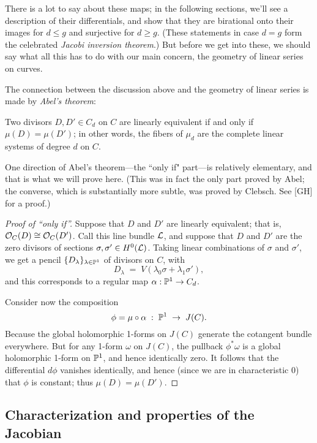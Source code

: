 There is a lot to say about these maps; in the following sections, we'll see a description of their differentials, and show that they are birational onto their images for $d \leq g$ and surjective for $d \geq g$. (These statements in case $d=g$ form the celebrated \emph{Jacobi inversion theorem}.) But before we get into these, we should say what all this has to do with our main concern, the geometry of linear series on curves.

The connection between the discussion above and the geometry of linear series is made by \emph{Abel's theorem}:

\begin{theorem}
Two divisors $D, D' \in C_d$ on $C$ are linearly equivalent if and only if $\mu(D) = \mu(D')$; in other words, the fibers of $\mu_d$ are the complete linear systems of degree $d$ on $C$.
\end{theorem}

One direction of Abel's theorem---the ``only if" part---is relatively elementary, and that is what we will prove here. (This was in fact the only part proved by Abel; the converse, which is substantially more subtle, was proved by Clebsch. See \cite{} [GH] for a proof.)

\begin{proof}[Proof of ``only if'']
Suppose that $D$ and $D'$ are linearly equivalent; that is, $\cO_C(D) \cong \cO_C(D')$. Call this line bundle $\cL$, and suppose that $D$ and $D'$ are the zero divisors of sections $\sigma, \sigma' \in H^0(\cL)$.
Taking linear combinations of $\sigma$ and $\sigma'$, we get a pencil $\{D_\lambda\}_{\lambda \in \PP^1}$ of divisors on $C$, with
$$
D_\lambda \; = \; V(\lambda_0\sigma + \lambda_1\sigma'),
$$
and this corresponds to a regular map $\alpha : \PP^1 \to C_d$. 

Consider now the composition
$$
\phi = \mu \circ \alpha \; : \; \PP^1 \; \to \; J(C).
$$
Because  the global holomorphic 1-forms on $J(C)$ generate the cotangent bundle everywhere. But for any 1-form $\omega$ on $J(C)$, the pullback $\phi^*\omega$ is a global holomorphic 1-form on $\PP^1$, and hence identically zero. It follows that the differential $d\phi$ vanishes identically, and hence (since we are in characteristic 0) that $\phi$ is constant; thus $\mu(D) = \mu(D')$.
\end{proof}

\subsection{Characterization and properties of the Jacobian}

